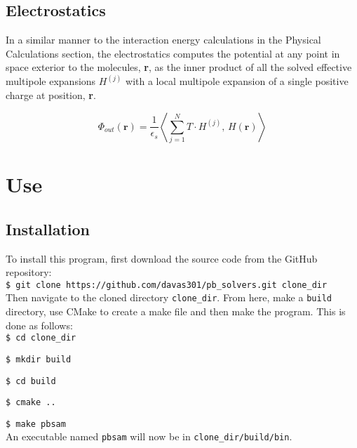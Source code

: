 \subsection{Electrostatics}

In a similar manner to the interaction energy calculations in the Physical Calculations section, 
the electrostatics computes the potential at any point in space exterior to the molecules, 
\textbf{r}, as the inner product of all the solved effective multipole expansions \(H^{(j)}\) 
with a local multipole expansion of a single positive charge at position, \textbf{r}.

\[\Phi_{out}(\textbf{r})= \frac{1}{\epsilon_s} \left \langle \sum_{j = 1}^N  T \cdot H^{(j) } , \,  H(\textbf{r})  \right \rangle \]

\clearpage


\section{Use}

\subsection{Installation}

To install this program, first download the source code from the GitHub repository: \\

\hspace{1cm}\texttt{\$ git clone https://github.com/davas301/pb\_solvers.git clone\_dir} \\

Then navigate to the cloned directory \texttt{clone\_dir}. From here, make a \texttt{build} 
directory, use CMake to create a make file and then make the program.  This is done as follows: \\

\hspace{1cm}\texttt{\$ cd clone\_dir} 

\hspace{1cm}\texttt{\$ mkdir build}

\hspace{1cm}\texttt{\$ cd build}

\hspace{1cm}\texttt{\$ cmake ..} 

\hspace{1cm}\texttt{\$ make pbsam} \\

An executable named \texttt{pbsam} will now be in \texttt{clone\_dir/build/bin}.

